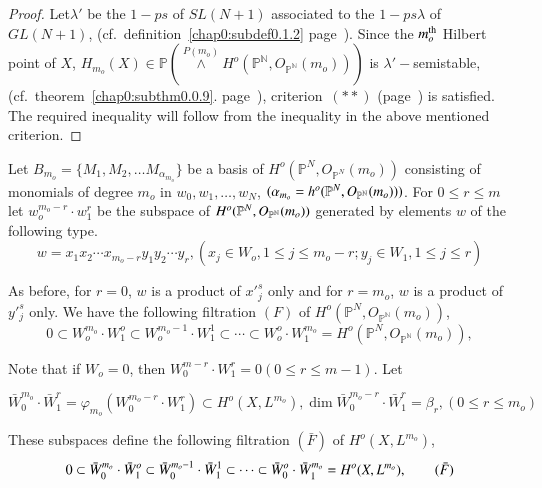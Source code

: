{\begin{proof}
\medskip
Let\pageoriginale $\lambda'$ be the $1-ps$ of $SL(N+1)$ associated to
the $1-ps 
\lambda$ of $GL(N+1)$, (cf.\ definition~\ref{chap0:subdef0.1.2} 
page~\pageref{chap0:subdef0.1.2}). Since the 
$m^{\rm th}_o$ Hilbert point of $X$, $H_{m_o}(X) \in
\mathbb{P} (\overset{P(m_o)}{\wedge} H^o (\mathbb{P^N},
O_{\mathbb{P^N}}(m_o)))$ is $\lambda'-$semistable, (cf.\ 
theorem~\ref{chap0:subthm0.0.9}. page~\pageref{chap0:subthm0.0.9}), 
criterion~$(**)$ (page~\pageref{page10}) is 
satisfied. The required inequality will follow from the inequality in
the above mentioned criterion. 
\end{proof}


Let $B_{m_o} = \{M_1, M_2, \ldots M_{\alpha_{m_o}}\}$ be a basis of
$H^o (\mathbb{P}^N, O_{\mathbb{P}^N}(m_o))$ consisting of monomials
of degree $m_o$ in $w_0, w_1, \ldots, w_N$, 
$(\alpha_{m_o} = h^o (\mathbb{P}^N,\break O_{\mathbb{P^N}}(m_o)))$. For $0
\leq r \leq m$ let $w^{m_o - r}_o \cdot w^{r}_{1}$ be the subspace of
$H^o (\mathbb{P}^N,\break O_{\mathbb{P^N}}(m_o))$ generated by elements $w$
of the following type. 
{\fontsize{10}{12}\selectfont
$$
w= x_1 x_2 \cdots x_{m_o -r} y_1 y_2 \cdots y_r, (x_j \in W_o,
1 \le j \le m_o -r ; y_j \in W_1, 1 \le j \le r) 
$$}\relax

\noindent
As before, for $r=0$, $w$ is a product of ${x'}^{s}_{j}$ only and for
$r=m_o$, $w$ is a product of $y'^{s}_j$ only. We have the following
filtration $(F)$ of $H^o (\mathbb{P}^N, O_{\mathbb{P^N}}(m_o))$, 
\begin{equation*}
0 \subset W^{m_o}_o \cdot W^o_1 \subset W^{m_o-1}_o \cdot W^{1}_{1}
\subset \cdots \subset W^{o}_{o} \cdot W^{m_o}_1 = H^o (\mathbb{P}^N,
O_{\mathbb{P^N}}(m_o)), \tag{F} 
\end{equation*}

\noindent
Note that if $W_o = 0$, then $W^{m-r}_0 \cdot W^r_1=0 (0 \leq r \leq
m-1)$. Let 

 $\bar{W}^{m_o}_0 \cdot \bar{W}^{r}_{1} = \varphi_{m_o} (W^{m_o-r}_0
\cdot W^{r}_{1}) \subset H^o (X, L^{m_o}), \dim \bar{W}^{m_o-r}_0
\cdot \bar{W}^r_1 =\beta_r, (0 \le r \le m_o)$ 

\noindent
These subspaces define the following filtration $(\bar{F})$ of $H^o
(X, L^{m_o})$, 
\begin{equation*}
0 \subset \bar{W}^{m_o}_0 \cdot \bar{W}^{o}_1 \subset \bar{W}^{m_o
  -1}_0 \cdot \bar{W}^{1}_{1} \subset \cdots \subset \bar{W}^o_0 \cdot
\bar{W}^{m_o}_1 = H^o (X,L^{m_o}), \tag{$\bar{F}$} 
\end{equation*}\pageoriginale

}
